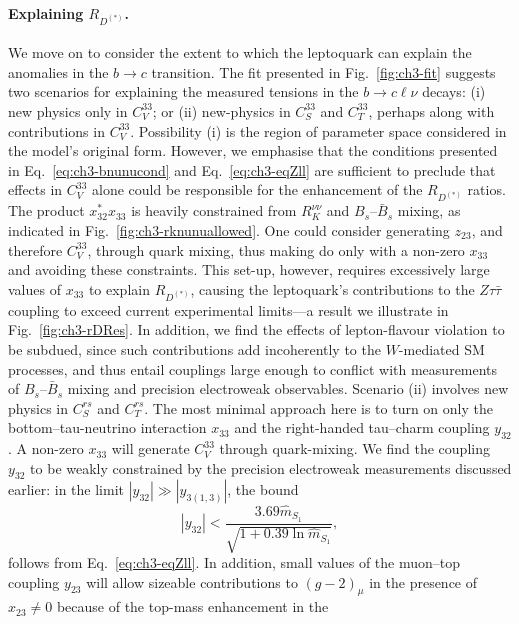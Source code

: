 \paragraph{Explaining $R_{D^{(*)}}$.} We move on to consider the extent to which
the leptoquark can explain the anomalies in the $b\to c$ transition. The fit
presented in Fig.~\ref{fig:ch3-fit} suggests two scenarios for explaining the
measured tensions in the $b \to c \ell \nu$ decays: (i) new physics only in
$C_V^{33}$; or (ii) new-physics in $C_S^{33}$ and $C_T^{33}$, perhaps along with
contributions in $C_{V}^{33}$. Possibility (i) is the region of parameter space
considered in the model's original form. However, we emphasise that the
conditions presented in Eq.~\eqref{eq:ch3-bnunucond} and
Eq.~\eqref{eq:ch3-eqZll} are sufficient to preclude that effects in $C_V^{33}$
alone could be responsible for the enhancement of the $R_{D^{(*)}}$ ratios. The
product $x_{32}^* x_{33}$ is heavily constrained from $R_K^{\nu\nu}$ and
$B_s$--$\bar{B}_s$ mixing, as indicated in Fig.~\ref{fig:ch3-rknunuallowed}. One
could consider generating $z_{23}$, and therefore $C_V^{33}$, through quark
mixing, thus making do only with a non-zero $x_{33}$ and avoiding these
constraints. This set-up, however, requires excessively large values of $x_{33}$
to explain $R_{D^{(*)}}$, causing the leptoquark's contributions to the
$Z\tau\bar{\tau}$ coupling to exceed current experimental limits---a result we
illustrate in Fig.~\ref{fig:ch3-rDRes}. In addition, we find the effects of
lepton-flavour violation to be subdued, since such contributions add
incoherently to the $W$-mediated SM processes, and thus entail couplings large
enough to conflict with measurements of $B_s$--$\bar{B}_s$ mixing and precision
electroweak observables. Scenario (ii) involves new physics in $C_S^{rs}$ and
$C_T^{rs}$. The most minimal approach here is to turn on only the
bottom--tau-neutrino interaction $x_{33}$ and the right-handed tau--charm
coupling $y_{32}$. A non-zero $x_{33}$ will generate $C_V^{33}$ through
quark-mixing. We find the coupling $y_{32}$ to be weakly constrained by the
precision electroweak measurements discussed earlier: in the limit
$|y_{32}| \gg |y_{3 (1,3)}|$, the bound
\begin{equation}
  |y_{32}| < \frac{3.69 \hat{m}_{S_{1}}}{\sqrt{1 + 0.39 \ln \hat{m}_{S_{1}}}},
\end{equation}
follows from Eq.~\eqref{eq:ch3-eqZll}. In addition, small values of the
muon--top coupling $y_{23}$ will allow sizeable contributions to $(g-2)_\mu$ in
the presence of $x_{23} \neq 0$ because of the top-mass enhancement in the
